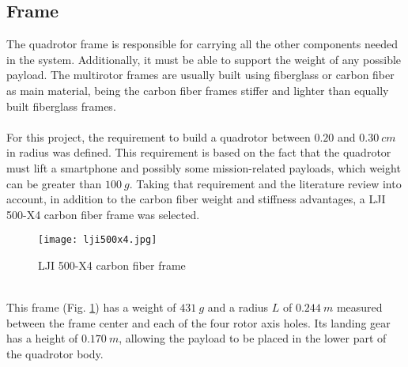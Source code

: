 \subsection{Frame}
The quadrotor frame is responsible for carrying all the other components needed in the system. Additionally, it must be able to support the weight of any possible payload. The multirotor frames are usually built using fiberglass or carbon fiber as main material, being the carbon fiber frames stiffer and lighter than equally built fiberglass frames.
\\\\
For this project, the requirement to build a quadrotor between $0.20$ and $0.30\ cm$ in radius was defined. This requirement is based on the fact that the quadrotor must lift a smartphone and possibly some mission-related payloads, which weight can be greater than $100\ g$. Taking that requirement and the literature review into account, in addition to the carbon fiber weight and stiffness advantages, a LJI 500-X4 carbon fiber frame was selected.
\begin{figure}[h]
\begin{center}
\texttt{[image: lji500x4.jpg]}    
\caption[LJI 500-X4 carbon fiber frame]{LJI 500-X4 carbon fiber frame\protect\footnotemark} 
\label{fig:quadframe}
\end{center}
\end{figure}
\\
This frame (Fig. \ref{fig:quadframe}) has a weight of $431\ g$ and a radius $L$ of $0.244\ m$ measured between the frame center and each of the four rotor axis holes. Its landing gear has a height of $0.170\ m$, allowing the payload to be placed in the lower part of the quadrotor body.

